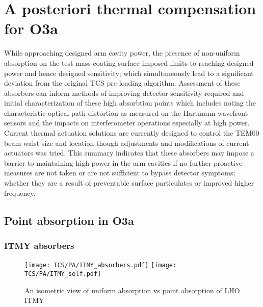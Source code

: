 \section{A posteriori thermal compensation for O3a}
While approaching designed arm cavity power, the presence of non-uniform absorption on the test mass coating surface imposed limits to reaching designed power and hence designed sensitivity; which simultaneously lead to a significant deviation from the original TCS pre-loading algorithm.  Assessment of these absorbers can inform methods of improving detector sensitivity required and initial characterization of these high absorbtion points which includes noting the characteristic optical path distortion as measured on the Hartmann wavefront sensors and the impacts on interferometer operations especially at high power. Current thermal actuation solutions are currently designed to control the TEM00 beam waist size and location though adjustments and modifications of current actuators was tried. This summary indicates that these absorbers may impose a barrier to maintaining high power in the arm cavities if no further proactive measures are not taken or are not sufficient to bypass detector symptoms; whether they are a result of preventable surface particulates or improved higher frequency.  


\subsection{Point absorption in O3a}
\subsubsection{ITMY absorbers}
\begin{figure}[H]
  \centering
  \begin{subcaptiongroup}
	  \texttt{[image: TCS/PA/ITMY\_absorbers.pdf]}
	  \label{subfig:itmypajustself}
	  \texttt{[image: TCS/PA/ITMY\_self.pdf]}
	  \label{subfig:itmypaselfplusabs}
  \end{subcaptiongroup}
  \captionsetup{subrefformat=parens}
  \hfill
  \caption{An isometric view of uniform absorption vs point absorption of LHO ITMY}
  \label{fig:ITMYpabs}
\end{figure}

